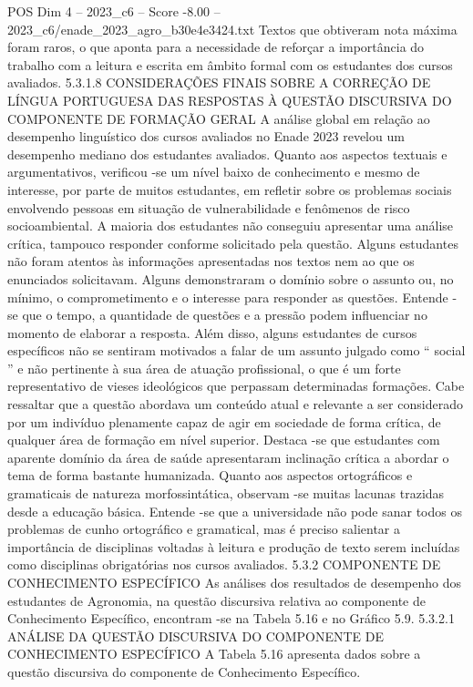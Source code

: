 \begin{textsample}{POS Dim 4 – 2023\_c6 – Score -8.00 – 2023\_c6/enade\_2023\_agro\_b30e4e3424.txt}
Textos que obtiveram nota máxima foram raros, o que aponta para a necessidade de reforçar a importância do trabalho com a leitura e escrita em âmbito formal com os estudantes dos cursos avaliados. 5.3.1.8 CONSIDERAÇÕES FINAIS SOBRE A CORREÇÃO DE LÍNGUA PORTUGUESA DAS RESPOSTAS À QUESTÃO DISCURSIVA DO COMPONENTE DE FORMAÇÃO GERAL A análise global em relação ao desempenho linguístico dos cursos avaliados no Enade 2023 revelou um desempenho mediano dos estudantes avaliados.
Quanto aos aspectos textuais e argumentativos, verificou -se um nível baixo de conhecimento e mesmo de interesse, por parte de muitos estudantes, em refletir sobre os problemas sociais envolvendo pessoas em situação de vulnerabilidade e fenômenos de risco socioambiental.
A maioria dos estudantes não conseguiu apresentar uma análise crítica, tampouco responder conforme solicitado pela questão.
Alguns estudantes não foram atentos às informações apresentadas nos textos nem ao que os enunciados solicitavam.
Alguns demonstraram o domínio sobre o assunto ou, no mínimo, o comprometimento e o interesse para responder as questões.
Entende -se que o tempo, a quantidade de questões e a pressão podem influenciar no momento de elaborar a resposta.
Além disso, alguns estudantes de cursos específicos não se sentiram motivados a falar de um assunto julgado como “ social ” e não pertinente à sua área de atuação profissional, o que é um forte representativo de vieses ideológicos que perpassam determinadas formações.
Cabe ressaltar que a questão abordava um conteúdo atual e relevante a ser considerado por um indivíduo plenamente capaz de agir em sociedade de forma crítica, de qualquer área de formação em nível superior.
Destaca -se que estudantes com aparente domínio da área de saúde apresentaram inclinação crítica a abordar o tema de forma bastante humanizada.
Quanto aos aspectos ortográficos e gramaticais de natureza morfossintática, observam -se muitas lacunas trazidas desde a educação básica.
Entende -se que a universidade não pode sanar todos os problemas de cunho ortográfico e gramatical, mas é preciso salientar a importância de disciplinas voltadas à leitura e produção de texto serem incluídas como disciplinas obrigatórias nos cursos avaliados. 5.3.2 COMPONENTE DE CONHECIMENTO ESPECÍFICO As análises dos resultados de desempenho dos estudantes de Agronomia, na questão discursiva relativa ao componente de Conhecimento Específico, encontram -se na Tabela 5.16 e no Gráfico 5.9. 5.3.2.1 ANÁLISE DA QUESTÃO DISCURSIVA DO COMPONENTE DE CONHECIMENTO ESPECÍFICO A Tabela 5.16 apresenta dados sobre a questão discursiva do componente de Conhecimento Específico.

\end{textsample}
